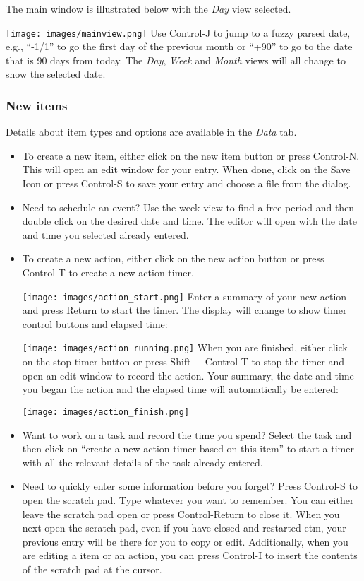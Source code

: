 \documentclass[]{article}
\makeatletter
\def\maxwidth{\ifdim\Gin@nat@width>\linewidth\linewidth
\else\Gin@nat@width\fi}
\let\Oldincludegraphics\includegraphics
\renewcommand{\includegraphics}[1]{\Oldincludegraphics[width=\maxwidth]{#1}}
\makeatother
\begin{document}
The main window is illustrated below with the \emph{Day} view selected.

\texttt{[image: images/mainview.png]}
Use Control-J to jump to a fuzzy parsed date, e.g., ``-1/1'' to go the
first day of the previous month or ``+90'' to go to the date that is 90
days from today. The \emph{Day}, \emph{Week} and \emph{Month} views will
all change to show the selected date.

\subsubsection{New items}

Details about item types and options are available in the \emph{Data}
tab.

\begin{itemize}
\item
  To create a new item, either click on the new item button or press
  Control-N. This will open an edit window for your entry. When done,
  click on the Save Icon or press Control-S to save your entry and
  choose a file from the dialog.
\item
  Need to schedule an event? Use the week view to find a free period and
  then double click on the desired date and time. The editor will open
  with the date and time you selected already entered.
\item
  To create a new action, either click on the new action button or press
  Control-T to create a new action timer.

  \texttt{[image: images/action\_start.png]}
  Enter a summary of your new action and press Return to start the
  timer. The display will change to show timer control buttons and
  elapsed time:

  \texttt{[image: images/action\_running.png]}
  When you are finished, either click on the stop timer button or press
  Shift + Control-T to stop the timer and open an edit window to record
  the action. Your summary, the date and time you began the action and
  the elapsed time will automatically be entered:

  \texttt{[image: images/action\_finish.png]}
\item
  Want to work on a task and record the time you spend? Select the task
  and then click on ``create a new action timer based on this item'' to
  start a timer with all the relevant details of the task already
  entered.
\item
  Need to quickly enter some information before you forget? Press
  Control-S to open the scratch pad. Type whatever you want to remember.
  You can either leave the scratch pad open or press Control-Return to
  close it. When you next open the scratch pad, even if you have closed
  and restarted etm, your previous entry will be there for you to copy
  or edit. Additionally, when you are editing a item or an action, you
  can press Control-I to insert the contents of the scratch pad at the
  cursor.
\end{itemize}
\end{document}
